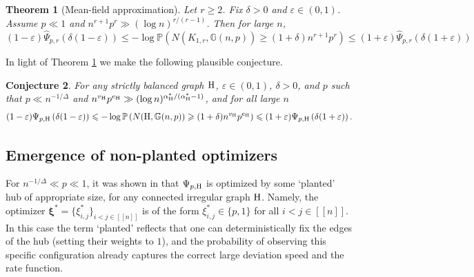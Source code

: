 \documentclass[a4paper,11pt,english,reqno]{amsart}
\numberwithin{equation}{section}
\renewcommand{\leq}{\leqslant}
\renewcommand{\geq}{\geqslant}
\newcommand{\uH}{\textup{H}}
\renewcommand{\P}{\mathbb{P}}
\newcommand{\G}{\mathbb{G}}
\newcommand{\tu}[1]{\textup{#1}}
\newcommand{\set}[1]{[\![#1]\!]}
\newtheorem{theorem}{Theorem}[section]
\newtheorem{conjecture}[theorem]{Conjecture}
\newcommand{\purple}[1]{{\color{purple} #1}}
\begin{document}
	
	
%	




%	
	
	
	
	
	 
	
	
	
	\begin{theorem}[Mean-field approximation]\label{thm:mean-field}
		Let $r\geq 2$. Fix $\delta>0$ and $\varepsilon\in(0,1)$. Assume $p \ll 1$ and $n^{r+1}p^{r}\gg (\log n)^{r/(r-1)}$. Then for large $n$,
		\begin{equation*}
			(1-\varepsilon)\widehat\Psi_{p, r}\left(\delta(1-\varepsilon)\right)\leq -\log\P\left(N(K_{1,r}, \G(n,p))\geq(1+\delta)n^{r+1}p^{r}\right) \leq (1+\varepsilon)\widehat\Psi_{p,r}\left(\delta(1+\varepsilon)\right)
		\end{equation*}
	\end{theorem}
	
	
	
	
	In light of Theorem \ref{thm:mean-field} we make the following plausible conjecture.
	\begin{conjecture}
		For any strictly balanced graph $\uH$, $\varepsilon \in (0,1)$, $\delta >0$, and $p$ such that $p \ll n^{-1/\Delta}$ and $n^{v_{\uH}} p^{e_{\uH}} \gg (\log n)^{\alpha_\uH^*/(\alpha_\uH^*-1)}$, and for all large $n$
		\[
		(1-\varepsilon)\Psi_{p, \uH}\left(\delta(1-\varepsilon)\right)\leq -\log\P\left(N(\uH, \G(n,p))\geq(1+\delta)n^{v_{\uH}}p^{e_{\uH}}\right) \leq (1+\varepsilon)\Psi_{p,\uH}\left(\delta(1+\varepsilon)\right).
		\]
	\end{conjecture}
	
	
	\subsection*{Emergence of non-planted optimizers} 
	For $n^{-1/\Delta}\ll p\ll 1$, it was shown  in \cite{BGLZ} that $\Psi_{p,\uH}$ is optimized by some `planted' hub of appropriate size, for any connected irregular graph $\uH$. Namely, the optimizer ${\bm \xi}^* =\{\xi_{i,j}^*\}_{i < j \in \set{n}}$ is of the form $\xi_{i,j}^* \in \{p,1\}$ for all $i < j \in \set{n}$. In this case the term `planted' reflects that one can deterministically fix the edges of the hub (setting their weights to $1$), and the probability of observing this specific configuration already captures the correct large deviation speed and the rate function.
	
\end{document}

